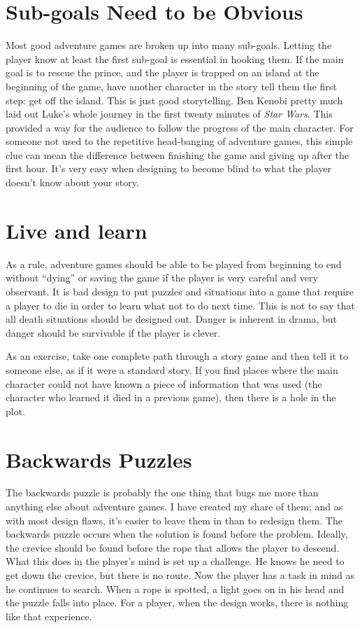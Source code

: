 \documentclass[12pt,letterpaper]{article}
\newcommand{\game}[1]{\textsl{#1}}
\begin{document}
\section*{Sub-goals Need to be Obvious} Most good adventure games are broken up
into many sub-goals. Letting the player know at least the first sub-goal is
essential in hooking them. If the main goal is to rescue the prince, and the
player is trapped on an island at the beginning of the game, have another
character in the story tell them the first step: get off the island. This is
just good storytelling. Ben Kenobi pretty much laid out Luke's whole journey in
the first twenty minutes of \game{Star Wars}. This provided a way for the audience to
follow the progress of the main character. For someone not used to the
repetitive head-banging of adventure games, this simple clue can mean the
difference between finishing the game and giving up after the first hour. It's
very easy when designing to become blind to what the player doesn't know about
your story.

\section*{Live and learn} As a rule, adventure games should be able to be
played from beginning to end without ``dying'' or saving the game if the player
is very careful and very observant. It is bad design to put puzzles and
situations into a game that require a player to die in order to learn what not
to do next time. This is not to say that all death situations should be
designed out. Danger is inherent in drama, but danger should be survivable if
the player is clever.

As an exercise, take one complete path through a story game and then tell it to
someone else, as if it were a standard story. If you find places where the main
character could not have known a piece of information that was used (the
character who learned it died in a previous game), then there is a hole in the
plot.

\section*{Backwards Puzzles} The backwards puzzle is probably the one thing
that bugs me more than anything else about adventure games. I have created my
share of them; and as with most design flaws, it's easier to leave them in than
to redesign them. The backwards puzzle occurs when the solution is found before
the problem. Ideally, the crevice should be found before the rope that allows
the player to descend. What this does in the player's mind is set up a
challenge. He knows he need to get down the crevice, but there is no route. Now
the player has a task in mind as he continues to search. When a rope is
spotted, a light goes on in his head and the puzzle falls into place. For a
player, when the design works, there is nothing like that experience.
\end{document}
